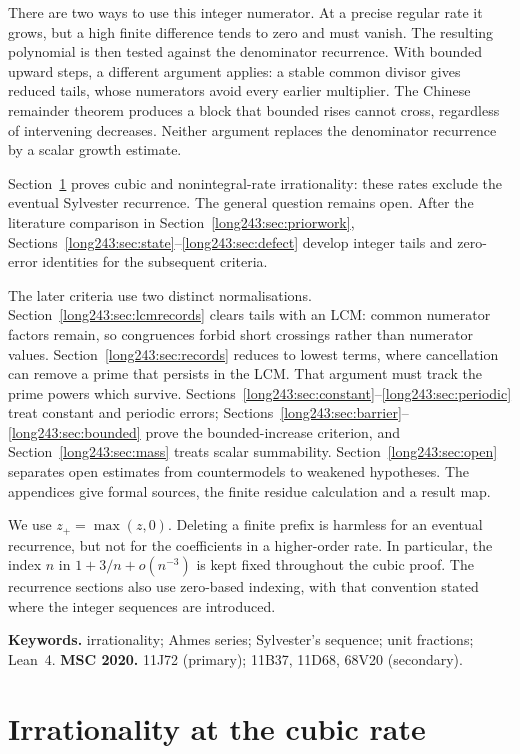 \documentclass[11pt]{article}
\begin{document}
There are two ways to use this integer numerator. At a precise regular
rate it grows, but a high finite difference tends to zero and must
vanish. The resulting polynomial is then tested against the denominator
recurrence. With bounded upward steps, a different argument applies:
a stable common divisor gives reduced tails, whose numerators avoid
every earlier multiplier. The Chinese remainder theorem produces a
block that bounded rises cannot cross, regardless of intervening
decreases. Neither argument replaces the denominator recurrence by a
scalar growth estimate.

Section~\ref{long243:sec:cubicrate} proves cubic and nonintegral-rate
irrationality: these rates exclude the eventual Sylvester recurrence.
The general question remains open. After the literature comparison in
Section~\ref{long243:sec:priorwork},
Sections~\ref{long243:sec:state}--\ref{long243:sec:defect} develop
integer tails and zero-error identities for the subsequent criteria.

The later criteria use two distinct normalisations.
Section~\ref{long243:sec:lcmrecords} clears tails with an LCM: common
numerator factors remain, so congruences forbid short crossings rather
than numerator values. Section~\ref{long243:sec:records} reduces to
lowest terms, where cancellation can remove a prime that persists in
the LCM. That argument must track the prime powers which survive. Sections~\ref{long243:sec:constant}--\ref{long243:sec:periodic}
treat constant and periodic errors;
Sections~\ref{long243:sec:barrier}--\ref{long243:sec:bounded} prove
the bounded-increase criterion, and Section~\ref{long243:sec:mass}
treats scalar summability. Section~\ref{long243:sec:open} separates open
estimates from countermodels to weakened hypotheses. The appendices
give formal sources, the finite residue calculation and a result map.

We use $z_+=\max(z,0)$. Deleting a finite prefix is harmless for an eventual
recurrence, but not for the coefficients in a higher-order rate. In
particular, the index $n$ in $1+3/n+o(n^{-3})$ is kept fixed throughout
the cubic proof. The recurrence sections also use zero-based indexing,
with that convention stated where the integer sequences are introduced.


\medskip
\noindent\textbf{Keywords.} irrationality; Ahmes series; Sylvester's sequence;
unit fractions; Lean~4.
\qquad
\textbf{MSC 2020.} 11J72 (primary); 11B37, 11D68, 68V20 (secondary).

\section{Irrationality at the cubic rate}\label{long243:sec:cubicrate}
\end{document}
